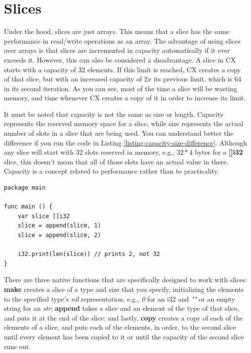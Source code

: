 \documentclass[11pt,fleqn,openany]{book} %
\begin{document}
\section{Slices}

Under the hood, slices are just arrays. This means that a slice has the same performance in read/write operations as an array. The advantage of using slices over arrays is that slices are incremented in capacity automatically if it ever exceeds it. However, this can also be considered a disadvantage. A slice in CX starts with a capacity of 32 elements. If this limit is reached, CX creates a copy of that slice, but with an increased capacity of $2x$ its previous limit, which is 64 in its second iteration. As you can see, most of the time a slice will be wasting memory, and time whenever CX creates a copy of it in order to increase its limit.

It must be noted that capacity is not the same as size or length. Capacity represents the reserved memory space for a slice, while size represents the actual number of slots in a slice that are being used. You can understand better the difference if you run the code in Listing \ref{listing:capacity-size-difference}. Although any slice will start with 32 slots reserved in memory, e.g., $32*4$ bytes for a \textbf{[]i32} slice, this doesn't mean that all of those slots have an actual value in there. Capacity is a concept related to performance rather than to practicality.

\begin{lstlisting}[caption={Difference Between Capacity and Size},captionpos=b,label={listing:capacity-size-difference}]
package main

func main () {
	var slice []i32
    slice = append(slice, 1)
    slice = append(slice, 2)
    
    i32.print(len(slice)) // prints 2, not 32
}
\end{lstlisting}

There are three native functions that are specifically designed to work with slices: \textbf{make} creates a slice of a type and size that you specify, initializing the elements to the specified type's \emph{nil} representation, e.g., \emph{0} for an i32 and \emph{""} or an empty string for an \emph{str}; \textbf{append} takes a slice and an element of the type of that slice, and puts it at the end of the slice; and lastly, \textbf{copy} creates a copy of each of the elements of a slice, and puts each of the elements, in order, to the second slice until every element has been copied to it or until the capacity of the second slice runs out.
\end{document}
